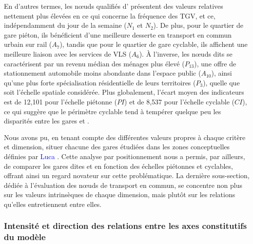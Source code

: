 \begin{refsegment}
En d’autres termes, les nœuds qualifiés d’ présentent des valeurs relatives nettement plus élevées en ce qui concerne la fréquence des \acrshort{TGV}, et ce, indépendamment du jour de la semaine (\(N_{1}\) et \(N_{2}\)). De plus, pour le quartier de gare piéton, ils bénéficient d’une meilleure desserte en transport en commun urbain sur rail (\(A_{7}\)), tandis que pour le quartier de gare cyclable, ils affichent une meilleure liaison avec les services de \acrshort{VLS} (\(A_{6}\)). À l’inverse, les nœuds dits  se caractérisent par un revenu médian des ménages plus élevé (\(P_{13}\)), une offre de stationnement automobile moins abondante dans l’\gls{espace public} (\(A_{10}\)), ainsi qu’une plus forte spécialisation résidentielle de leurs territoires (\(P_{3}\)), quelle que soit l’échelle spatiale considérée. Plus globalement, l’écart moyen des indicateurs est de 12,101 pour l’échelle piétonne (\(PI\)) et de 8,537 pour l’échelle cyclable (\(CI\)), ce qui suggère que le périmètre cyclable tend à tempérer quelque peu les disparités entre les gares  et .%

Nous avons pu, en tenant compte des différentes valeurs propres à chaque critère et dimension, situer chacune des gares étudiées dans les zones conceptuelles définies par \textcolor{blue}{Luca} \textcolor{blue}{\textcite[344]{bertolini_nodes_1996}}. Cette analyse par positionnement nous a permis, par ailleurs, de comparer les gares dites  et  en fonction des échelles piétonnes et cyclables, offrant ainsi un regard novateur sur cette problématique. La dernière sous-section, dédiée à l’évaluation des nœuds de transport en commun, se concentre non plus sur les valeurs intrinsèques de chaque dimension, mais plutôt sur les relations qu'elles entretiennent entre elles.%

\subsubsection*{Intensité et direction des relations entre les axes constitutifs du modèle
    \label{chap6:results-correlation-dimensions}
    }


\end{refsegment}
